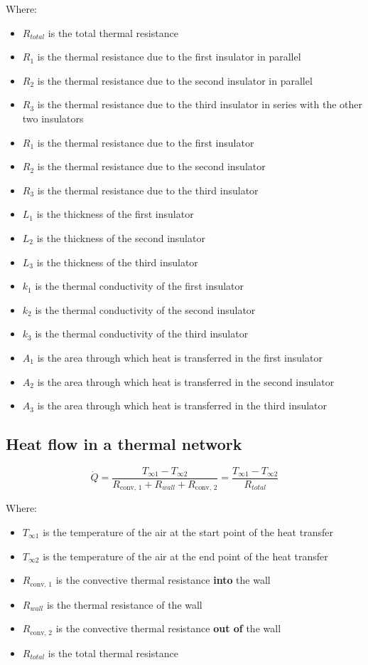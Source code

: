 \documentclass[11pt]{article}
\begin{document}
Where:
\begin{itemize}
\item \(R_{total}\) is the total thermal resistance
\item \(R_1\) is the thermal resistance due to the first insulator in parallel
\item \(R_2\) is the thermal resistance due to the second insulator in parallel
\item \(R_3\) is the thermal resistance due to the third insulator in series with the other two insulators
\item \(R_1\) is the thermal resistance due to the first insulator
\item \(R_2\) is the thermal resistance due to the second insulator
\item \(R_3\) is the thermal resistance due to the third insulator
\item \(L_1\) is the thickness of the first insulator
\item \(L_2\) is the thickness of the second insulator
\item \(L_3\) is the thickness of the third insulator
\item \(k_1\) is the thermal conductivity of the first insulator
\item \(k_2\) is the thermal conductivity of the second insulator
\item \(k_3\) is the thermal conductivity of the third insulator
\item \(A_1\) is the area through which heat is transferred in the first insulator
\item \(A_2\) is the area through which heat is transferred in the second insulator
\item \(A_3\) is the area through which heat is transferred in the third insulator
\end{itemize}

\subsection{Heat flow in a thermal network}
\label{sec:org00ba53f}
\[\dot{Q} = \frac{T_{\infty 1} - T_{\infty 2}}{R_{\text{conv, 1}} + R_{wall} + R_{\text{conv, 2}}} = \frac{T_{\infty 1} - T_{\infty 2}}{R_{total}}\]

Where:
\begin{itemize}
\item \(T_{\infty 1}\) is the temperature of the air at the start point of the heat transfer
\item \(T_{\infty 2}\) is the temperature of the air at the end point of the heat transfer
\item \(R_{\text{conv, 1}}\) is the convective thermal resistance \textbf{into} the wall
\item \(R_{wall}\) is the thermal resistance of the wall
\item \(R_{\text{conv, 2}}\) is the convective thermal resistance \textbf{out of} the wall
\item \(R_{total}\) is the total thermal resistance
\end{itemize}
\end{document}
